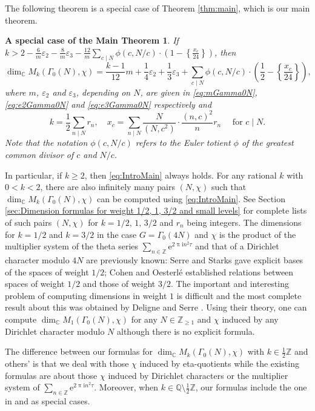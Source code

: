 \documentclass[12pt]{amsart}
\numberwithin{equation}{section}
\theoremstyle{plain}
\newtheorem*{thm*}{A special case of the Main Theorem}{}
\theoremstyle{definition}
\theoremstyle{remark}
\newcommand\rmi{\mathrm{i}}
\newcommand\rme{\mathrm{e}}
\newcommand\numZ{\mathbb{Z}}
\newcommand\numQ{\mathbb{Q}}
\newcommand\numC{\mathbb{C}}
\newcommand\numgeq[2]{\mathbb{#1}_{\geq #2}}
\begin{document}
The following theorem is a special case of Theorem \ref{thm:main}, which is our main theorem.
\begin{thm*}
If $k>2-\frac{6}{m}\varepsilon_2-\frac{8}{m}\varepsilon_3-\frac{12}{m}\sum_{c\mid N}\phi(c,N/c)\cdot\left(1-\left\{\frac{x_c}{24}\right\}\right)$, then
\begin{equation}
\label{eq:IntroMain}
\dim_\numC M_k(\Gamma_0(N), \chi)=\frac{k-1}{12}m+\frac{1}{4}\varepsilon_2+\frac{1}{3}\varepsilon_3+\sum_{c\mid N}\phi(c,N/c)\cdot\left(\frac{1}{2}-\left\{\frac{x_c}{24}\right\}\right),
\end{equation}
where $m$, $\varepsilon_2$ and $\varepsilon_3$, depending on $N$, are given in \eqref{eq:mGamma0N}, \eqref{eq:e2Gamma0N} and \eqref{eq:e3Gamma0N} respectively and
\begin{equation*}
k=\frac{1}{2}\sum_{n\mid N}r_n,\quad x_c=\sum_{n\mid N}\frac{N}{(N,c^2)}\cdot\frac{(n,c)^2}{n}r_n\quad\text{  for }c\mid N.
\end{equation*}
Note that the notation $\phi(c,N/c)$ refers to the Euler totient $\phi$ of the greatest common divisor of $c$ and $N/c$.
\end{thm*}

In particular, if $k\geq2$, then \eqref{eq:IntroMain} always holds. For any rational $k$ with $0<k<2$, there are also infinitely many pairs $(N,\chi)$ such that $\dim_\numC M_k(\Gamma_0(N), \chi)$ can be computed using \eqref{eq:IntroMain}. See Section \ref{sec:Dimension formulas for weight 1/2, 1, 3/2 and small levels} for complete lists of such pairs $(N,\chi)$ for $k=1/2,\,1,\,3/2$ and $r_n$ being integers. The dimensions for $k=1/2$ and $k=3/2$ in the case $G=\Gamma_0(4N)$ and $\chi$ is the product of the multiplier system of the theta series $\sum_{n\in\numZ}\rme^{2\uppi\rmi n^2\tau}$ and that of a Dirichlet character modulo $4N$ are previously known: Serre and Starks \cite{SS77} gave explicit bases of the spaces of weight $1/2$; Cohen and Oesterl\'e \cite{CO77} established relations between spaces of weight $1/2$ and those of weight $3/2$. The important and interesting problem of computing dimensions in weight $1$ is difficult and the most complete result about this was obtained by Deligne and Serre \cite{DS74}. Using their theory, one can compute $\dim_\numC M_1(\Gamma_0(N), \chi)$ for any $N\in\numgeq{Z}{1}$ and $\chi$ induced by any Dirichlet character modulo $N$ although there is no explicit formula.

The difference between our formulas for $\dim_\numC M_k(\Gamma_0(N), \chi)$ with $k\in\frac{1}{2}\numZ$ and others' is that we deal with those $\chi$ induced by eta-quotients while the existing formulas are about those $\chi$ induced by Dirichlet characters or the multiplier system of $\sum_{n\in\numZ}\rme^{2\uppi\rmi n^2\tau}$. Moreover, when $k\in\numQ\setminus\frac{1}{2}\numZ$, our formulas include the one in \cite[Lemma 1.7]{Ibu00} and \cite[p. 5]{Ibu20} as special cases.
\end{document}
